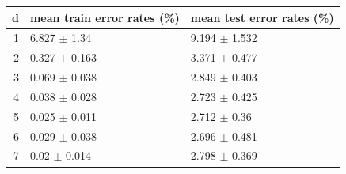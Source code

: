 \begin{tabular}{rll}
\toprule
d & mean train error rates (\%) & mean test error rates (\%) \\
\midrule
1 & 6.827 $\pm$ 1.34 & 9.194 $\pm$ 1.532 \\
2 & 0.327 $\pm$ 0.163 & 3.371 $\pm$ 0.477 \\
3 & 0.069 $\pm$ 0.038 & 2.849 $\pm$ 0.403 \\
4 & 0.038 $\pm$ 0.028 & 2.723 $\pm$ 0.425 \\
5 & 0.025 $\pm$ 0.011 & 2.712 $\pm$ 0.36 \\
6 & 0.029 $\pm$ 0.038 & 2.696 $\pm$ 0.481 \\
7 & 0.02 $\pm$ 0.014 & 2.798 $\pm$ 0.369 \\
\bottomrule
\end{tabular}
